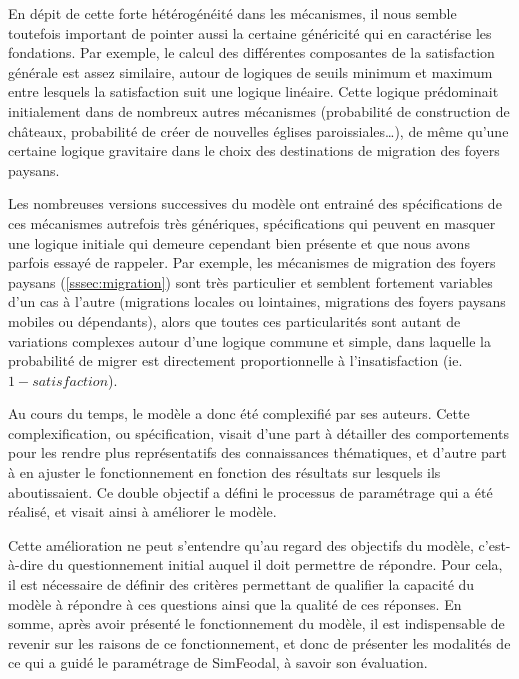 En dépit de cette forte hétérogénéité dans les mécanismes, il nous semble toutefois important de pointer aussi la certaine généricité qui en caractérise les fondations.
Par exemple, le calcul des différentes composantes de la satisfaction générale est assez similaire, autour de logiques de seuils minimum et maximum entre lesquels la satisfaction suit une logique linéaire.
Cette logique prédominait initialement dans de nombreux autres mécanismes (probabilité de construction de châteaux, probabilité de créer de nouvelles églises paroissiales\ldots), de même qu'une certaine logique gravitaire dans le choix des destinations de migration des foyers paysans.

Les nombreuses versions successives du modèle ont entrainé des spécifications de ces mécanismes autrefois très génériques, spécifications qui peuvent en masquer une logique initiale qui demeure cependant bien présente et que nous avons parfois essayé de rappeler.
Par exemple, les mécanismes de migration des foyers paysans (\cref{sssec:migration}) sont très particulier et semblent fortement variables d'un cas à l'autre (migrations locales ou lointaines, migrations des foyers paysans \og mobiles\fg{} ou \og dépendants\fg{}), alors que toutes ces particularités sont autant de variations complexes autour d'une logique commune et simple, dans laquelle la probabilité de migrer est directement proportionnelle à l'insatisfaction (ie. $1 - satisfaction$).

Au cours du temps, le modèle a donc été complexifié par ses auteurs.
Cette complexification, ou spécification, visait d'une part à détailler des comportements pour les rendre plus représentatifs des connaissances thématiques, et d'autre part à en ajuster le fonctionnement en fonction des résultats sur lesquels ils aboutissaient.
Ce double objectif a défini le processus de \og paramétrage\fg{} qui a été réalisé, et visait ainsi à \og améliorer\fg{} le modèle.

Cette \og amélioration\fg{} ne peut s'entendre qu'au regard des objectifs du modèle, c'est-à-dire du questionnement initial auquel il doit permettre de répondre.
Pour cela, il est nécessaire de définir des critères permettant de qualifier la capacité du modèle à répondre à ces questions ainsi que la qualité de ces réponses.
En somme, après avoir présenté le fonctionnement du modèle, il est indispensable de revenir sur les raisons de ce fonctionnement, et donc de présenter les modalités de ce qui a guidé le paramétrage de SimFeodal, à savoir son évaluation.
